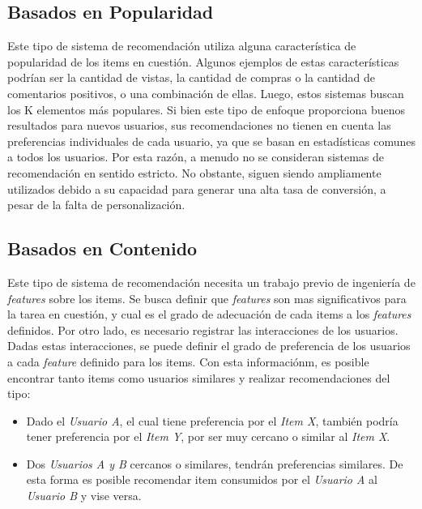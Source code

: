 \documentclass[11pt,a4paper,twoside]{thesis}
\begin{document}
\subsection{Basados en Popularidad}

Este tipo de sistema de recomendación utiliza alguna característica de
popularidad de los items en cuestión. Algunos ejemplos de estas características
podrían ser la cantidad de vistas, la cantidad de compras o la cantidad de
comentarios positivos, o una combinación de ellas. Luego, estos sistemas buscan
los K elementos más populares. Si bien este tipo de enfoque proporciona buenos
resultados para nuevos usuarios, sus recomendaciones no tienen en cuenta las
preferencias individuales de cada usuario, ya que se basan en estadísticas
comunes a todos los usuarios. Por esta razón, a menudo no se consideran
sistemas de recomendación en sentido estricto. No obstante, siguen siendo
ampliamente utilizados debido a su capacidad para generar una alta tasa de
conversión, a pesar de la falta de personalización.

\subsection{Basados en Contenido}

Este tipo de sistema de recomendación necesita un trabajo previo de ingeniería
de \textit{features} sobre los items. Se busca definir que \textit{features}
son mas significativos para la tarea en cuestión, y cual es el grado de
adecuación de cada items a los \textit{features} definidos. Por otro lado, es
necesario registrar las interacciones de los usuarios. Dadas estas
interacciones, se puede definir el grado de preferencia de los usuarios a cada
\textit{feature} definido para los items. Con esta informaciónm, es posible
encontrar tanto items como usuarios similares y realizar recomendaciones del
tipo:

\begin{itemize}
	\item Dado el \textit{Usuario A}, el cual tiene preferencia por el \textit{Item X},
	      también podría tener preferencia por el \textit{Item Y}, por ser muy cercano o
	      similar al \textit{Item X}.
	\item Dos \textit{Usuarios A y B} cercanos o similares, tendrán preferencias
	      similares. De esta forma es posible recomendar item consumidos por el
	      \textit{Usuario A} al \textit{Usuario B} y vise versa.
\end{itemize}
\end{document}
